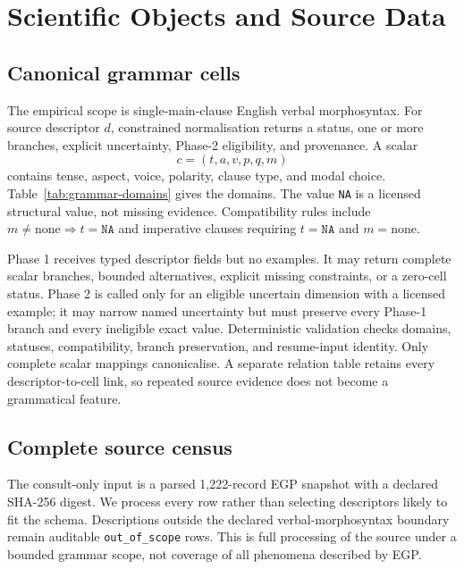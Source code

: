 \section{Scientific Objects and Source Data}
\label{sec:task-data}

\subsection{Canonical grammar cells}

The empirical scope is single-main-clause English verbal morphosyntax.  For
source descriptor $d$, constrained normalisation returns a status, one or more
branches, explicit uncertainty, Phase-2 eligibility, and provenance.  A scalar
\grammarcell{}
\begin{equation}
  c=(t,a,v,p,q,m)
\end{equation}
contains tense, aspect, voice, polarity, clause type, and modal choice.
Table~\ref{tab:grammar-domains} gives the domains.  The value
\texttt{NA} is a licensed structural value, not missing evidence.
Compatibility rules include
$m\ne\text{none}\Rightarrow t=\texttt{NA}$ and imperative clauses requiring
$t=\texttt{NA}$ and $m=\text{none}$.



Phase 1 receives typed descriptor fields but no examples.  It may return
complete scalar branches, bounded alternatives, explicit missing constraints,
or a zero-cell status.  Phase 2 is called only for an eligible uncertain
dimension with a licensed example; it may narrow named uncertainty but must
preserve every Phase-1 branch and every ineligible exact value.  Deterministic
validation checks domains, statuses, compatibility, branch preservation, and
resume-input identity.  Only complete scalar mappings canonicalise.  A
separate relation table retains every descriptor-to-cell link, so repeated
source evidence does not become a grammatical feature.

\subsection{Complete source census}

The consult-only input is a parsed 1,222-record EGP snapshot with a declared
SHA-256 digest.  We process every row rather than selecting descriptors likely
to fit the schema.  Descriptions outside the declared verbal-morphosyntax
boundary remain auditable \texttt{out\_of\_scope} rows.  This is full processing
of the source under a bounded grammar scope, not coverage of all phenomena
described by EGP.

